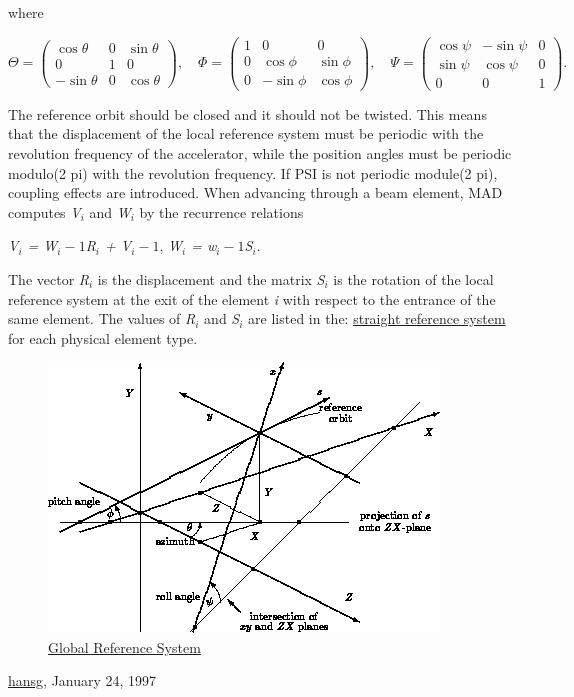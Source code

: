 where 

\[
\Theta =
 \begin{pmatrix}
  \cos \theta & 0 &  \sin \theta \\
  0 & 1 &  0 \\
  -\sin \theta & 0 &  \cos \theta
 \end{pmatrix}
, \quad
\Phi =
 \begin{pmatrix}
  1 & 0 &  0 \\
  0 & \cos \phi &  \sin \phi \\
  0 & -\sin \phi &  \cos \phi
 \end{pmatrix}
, \quad
\Psi =
 \begin{pmatrix}
  \cos \psi &  -\sin \psi & 0 \\
  \sin \psi &  \cos \psi & 0 \\
	0			&	0			 & 1 
 \end{pmatrix}
.
\]

 The reference orbit should be closed and it should not be twisted. This means that the displacement of the local reference system must be periodic with the revolution frequency of the accelerator, while the position angles must be periodic modulo(2 pi) with the revolution frequency. If PSI is not periodic module(2 pi), coupling effects are introduced. When advancing through a beam element, MAD computes \textit{V$_i$} and \textit{W$_i$} by the recurrence relations 

\textit{V$_i$ = W$_i-1$R$_i$ + V$_i-1$}, \textit{W$_i$ = w$_i-1$S$_i$}. 

 The vector \textit{R$_i$} is the displacement and the matrix \textit{S$_i$} is the rotation of the local reference system  at the exit of the element \textit{i} with respect to the entrance  of the same element. The values of \textit{R$_i$} and \textit{S$_i$} are listed in the:   \href{local_system.html#straight}{straight reference system} for each physical element type. 
%
\begin{figure}[h!]
  \centering
	\includegraphics{figures/global.png}
  \caption{\href{global}{Global Reference System }}%
\end{figure}

\href{http://www.cern.ch/Hans.Grote/hansg_sign.html}{hansg}, January 24, 1997 

